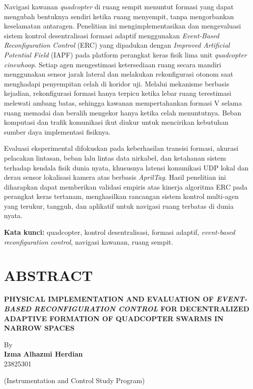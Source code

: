\documentclass[12pt,a4paper]{report}
\begin{document}
\vspace{0.8cm}

\noindent
Navigasi kawanan \textit{quadcopter} di ruang sempit menuntut formasi yang dapat mengubah bentuknya sendiri ketika ruang menyempit, tanpa mengorbankan keselamatan antaragen. Penelitian ini mengimplementasikan dan mengevaluasi sistem kontrol desentralisasi formasi adaptif menggunakan \textit{Event-Based Reconfiguration Control} (ERC) yang dipadukan dengan \textit{Improved Artificial Potential Field} (IAPF) pada platform perangkat keras fisik lima unit \textit{quadcopter cinewhoop}. Setiap agen mengestimasi ketersediaan ruang secara mandiri menggunakan sensor jarak lateral dan melakukan rekonfigurasi otonom saat menghadapi penyempitan celah di koridor uji. Melalui mekanisme berbasis kejadian, rekonfigurasi formasi hanya terpicu ketika lebar ruang terestimasi melewati ambang batas, sehingga kawanan mempertahankan formasi V selama ruang memadai dan beralih mengekor hanya ketika celah menuntutnya. Beban komputasi dan trafik komunikasi ikut diukur untuk mencirikan kebutuhan sumber daya implementasi fisiknya.

\noindent
Evaluasi eksperimental difokuskan pada keberhasilan transisi formasi, akurasi pelacakan lintasan, beban lalu lintas data nirkabel, dan ketahanan sistem terhadap kendala fisik dunia nyata, khususnya latensi komunikasi UDP lokal dan derau sensor lokalisasi kamera atas berbasis \textit{AprilTag}. Hasil penelitian ini diharapkan dapat memberikan validasi empiris atas kinerja algoritma ERC pada perangkat keras tertanam, menghasilkan rancangan sistem kontrol multi-agen yang terukur, tangguh, dan aplikatif untuk navigasi ruang terbatas di dunia nyata.

\vspace{1cm}
\noindent \textbf{Kata kunci:} quadcopter, kontrol desentralisasi, formasi adaptif, \textit{event-based reconfiguration control}, navigasi kawanan, ruang sempit.

\chapter*{ABSTRACT}

\begin{center}
    \textbf{PHYSICAL IMPLEMENTATION AND EVALUATION OF \textit{EVENT-BASED RECONFIGURATION CONTROL} FOR DECENTRALIZED ADAPTIVE FORMATION OF QUADCOPTER SWARMS IN NARROW SPACES}

    \vspace{0.8cm}
    By\\
    \textbf{Izma Alhazmi Herdian}\\
    23825301

    \vspace{0.8cm}
    (Instrumentation and Control Study Program)
\end{center}
\end{document}
